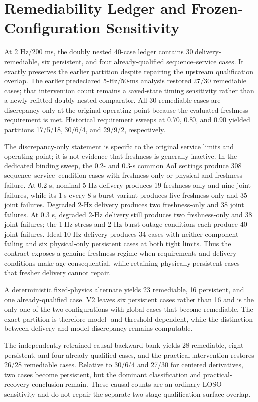 \documentclass[journal,onecolumn]{IEEEtran}
\begin{document}
\section{Remediability Ledger and Frozen-Configuration Sensitivity}
At 2 Hz/200 ms, the doubly nested 40-case ledger contains 30 delivery-remediable, six persistent, and four already-qualified sequence--service cases. It exactly preserves the earlier partition despite repairing the upstream qualification overlap. The earlier predeclared 5-Hz/50-ms analysis restored 27/30 remediable cases; that intervention count remains a saved-state timing sensitivity rather than a newly refitted doubly nested comparator. All 30 remediable cases are discrepancy-only at the original operating point because the evaluated freshness requirement is met. Historical requirement sweeps at 0.70, 0.80, and 0.90 yielded partitions 17/5/18, 30/6/4, and 29/9/2, respectively.

The discrepancy-only statement is specific to the original service limits and operating point; it is not evidence that freshness is generally inactive. In the dedicated binding sweep, the 0.2- and 0.3-s common AoI settings produce 308 sequence--service--condition cases with freshness-only or physical-and-freshness failure. At 0.2 s, nominal 5-Hz delivery produces 19 freshness-only and nine joint failures, while its 1-s-every-8-s burst variant produces five freshness-only and 35 joint failures. Degraded 2-Hz delivery produces two freshness-only and 38 joint failures. At 0.3 s, degraded 2-Hz delivery still produces two freshness-only and 38 joint failures; the 1-Hz stress and 2-Hz burst-outage conditions each produce 40 joint failures. Ideal 10-Hz delivery produces 34 cases with neither component failing and six physical-only persistent cases at both tight limits. Thus the contract exposes a genuine freshness regime when requirements and delivery conditions make age consequential, while retaining physically persistent cases that fresher delivery cannot repair.

A deterministic fixed-physics alternate yields 23 remediable, 16 persistent, and one already-qualified case. V2 leaves six persistent cases rather than 16 and is the only one of the two configurations with global cases that become remediable. The exact partition is therefore model- and threshold-dependent, while the distinction between delivery and model discrepancy remains computable.

The independently retrained causal-backward bank yields 28 remediable, eight persistent, and four already-qualified cases, and the practical intervention restores 26/28 remediable cases. Relative to 30/6/4 and 27/30 for centered derivatives, two cases become persistent, but the dominant classification and practical-recovery conclusion remain. These causal counts are an ordinary-LOSO sensitivity and do not repair the separate two-stage qualification-surface overlap.
\end{document}

